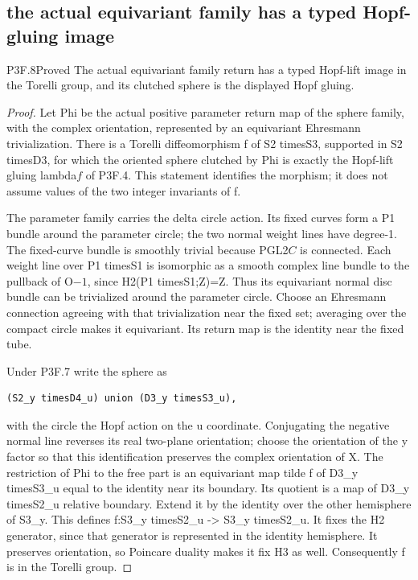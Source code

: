 \subsection{the actual equivariant family has a typed Hopf-gluing image}
\begin{statement}{P3F.8}{Proved}
The actual equivariant family return has a typed Hopf-lift image in the Torelli group, and its clutched sphere is the displayed Hopf gluing.
\end{statement}
\begin{proof}
Let Phi be the actual positive parameter return map of the sphere family, with the complex orientation, represented by an equivariant Ehresmann trivialization. There is a Torelli diffeomorphism f of S2 timesS3, supported in S2 timesD3, for which the oriented sphere clutched by Phi is exactly the Hopf-lift gluing lambda\(f\) of P3F.4. This statement identifies the morphism; it does not assume values of the two integer invariants of f.

The parameter family carries the delta circle action. Its fixed curves form a P1 bundle around the parameter circle; the two normal weight lines have degree-1. The fixed-curve bundle is smoothly trivial because PGL2\(C\) is connected. Each weight line over P1 timesS1 is isomorphic as a smooth complex line bundle to the pullback of O\(-1\), since H2(P1 timesS1;Z)=Z. Thus its equivariant normal disc bundle can be trivialized around the parameter circle. Choose an Ehresmann connection agreeing with that trivialization near the fixed set; averaging over the compact circle makes it equivariant. Its return map is the identity near the fixed tube.

Under P3F.7 write the sphere as

\begin{lstlisting}
(S2_y timesD4_u) union (D3_y timesS3_u),
\end{lstlisting}

with the circle the Hopf action on the u coordinate. Conjugating the negative normal line reverses its real two-plane orientation; choose the orientation of the y factor so that this identification preserves the complex orientation of X. The restriction of Phi to the free part is an equivariant map tilde f of D3\_y timesS3\_u equal to the identity near its boundary. Its quotient is a map of D3\_y timesS2\_u relative boundary. Extend it by the identity over the other hemisphere of S3\_y. This defines f:S3\_y timesS2\_u -\textgreater{} S3\_y timesS2\_u. It fixes the H2 generator, since that generator is represented in the identity hemisphere. It preserves orientation, so Poincare duality makes it fix H3 as well. Consequently f is in the Torelli group.


\end{proof}
